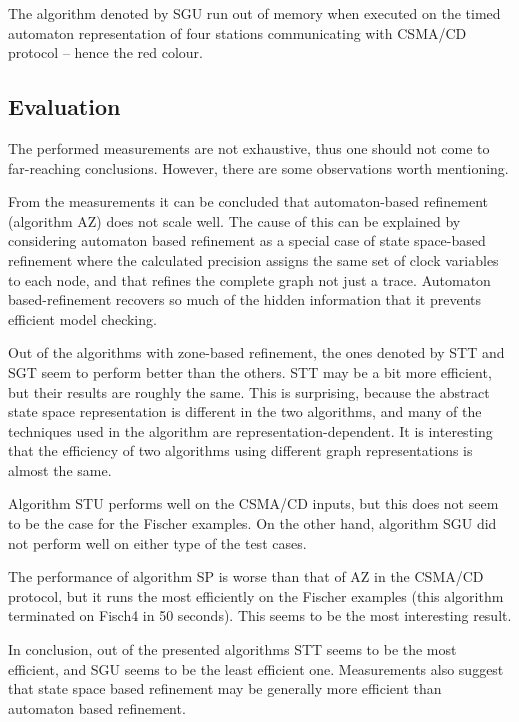 The algorithm denoted by SGU run out of memory when executed on the timed automaton representation of four stations communicating with CSMA/CD protocol -- hence the red colour.

\subsection{Evaluation}

The performed measurements are not exhaustive, thus one should not come to far-reaching conclusions. However, there are some observations worth mentioning.

From the measurements it can be concluded that automaton-based refinement (algorithm AZ) does not scale well. The cause of this can be explained by considering automaton based refinement as a special case of state space-based refinement where the calculated precision assigns the same set of clock variables to each node, and that refines the complete graph not just a trace. Automaton based-refinement recovers so much of the hidden information that it prevents efficient model checking.

Out of the algorithms with zone-based refinement, the ones denoted by STT and SGT seem to perform better than the others. STT may be a bit more efficient, but their results are roughly the same. This is surprising, because the abstract state space representation is different in the two algorithms, and many of the techniques used in the algorithm are representation-dependent. It is interesting that the efficiency of two algorithms using different graph representations is almost the same.

Algorithm STU performs well on the CSMA/CD inputs, but this does not seem to be the case for the Fischer examples. On the other hand, algorithm SGU did not perform well on either type of the test cases.

The performance of algorithm SP is worse than that of AZ in the CSMA/CD protocol, but it runs the most efficiently on the Fischer examples (this algorithm terminated on Fisch4 in 50 seconds). This seems to be the most interesting result.

In conclusion, out of the presented algorithms STT seems to be the most efficient, and SGU seems to be the least efficient one. Measurements also suggest that state space based refinement may be generally more efficient than automaton based refinement.





